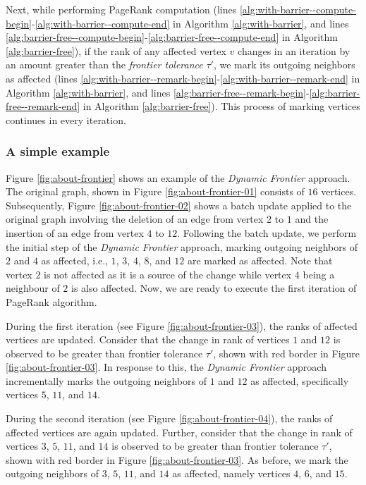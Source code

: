 Next, while performing PageRank computation (lines \ref{alg:with-barrier--compute-begin}-\ref{alg:with-barrier--compute-end} in Algorithm \ref{alg:with-barrier}, and lines \ref{alg:barrier-free--compute-begin}-\ref{alg:barrier-free--compute-end} in Algorithm \ref{alg:barrier-free}), if the rank of any affected vertex $v$ changes in an iteration by an amount greater than the \textit{frontier tolerance} $\tau'$, we mark its outgoing neighbors as affected (lines \ref{alg:with-barrier--remark-begin}-\ref{alg:with-barrier--remark-end} in Algorithm \ref{alg:with-barrier}, and lines \ref{alg:barrier-free--remark-begin}-\ref{alg:barrier-free--remark-end} in Algorithm \ref{alg:barrier-free}). This process of marking vertices continues in every iteration.




\subsubsection{A simple example}

Figure \ref{fig:about-frontier} shows an example of the \textit{Dynamic Frontier} approach. The original graph, shown in Figure \ref{fig:about-frontier-01} consists of $16$ vertices. Subsequently, Figure \ref{fig:about-frontier-02} shows a batch update applied to the original graph involving the deletion of an edge from vertex $2$ to $1$ and the insertion of an edge from vertex $4$ to $12$. Following the batch update, we perform the initial step of the \textit{Dynamic Frontier} approach, marking outgoing neighbors of $2$ and $4$ as affected, i.e., $1$, $3$, $4$, $8$, and $12$ are marked as affected. Note that vertex $2$ is not affected as it is a source of the change while vertex $4$ being a neighbour of $2$ is also affected. Now, we are ready to execute the first iteration of PageRank algorithm.

During the first iteration (see Figure \ref{fig:about-frontier-03}), the ranks of affected vertices are updated. Consider that the change in rank of vertices $1$ and $12$ is observed to be greater than frontier tolerance $\tau'$, shown with red border in Figure \ref{fig:about-frontier-03}. In response to this, the \textit{Dynamic Frontier} approach incrementally marks the outgoing neighbors of $1$ and $12$ as affected, specifically vertices $5$, $11$, and $14$.

During the second iteration (see Figure \ref{fig:about-frontier-04}), the ranks of affected vertices are again updated. Further, consider that the change in rank of vertices $3$, $5$, $11$, and $14$ is observed to be greater than frontier tolerance $\tau'$, shown with red border in Figure \ref{fig:about-frontier-03}. As before, we mark the outgoing neighbors of $3$, $5$, $11$, and $14$ as affected, namely vertices $4$, $6$, and $15$.

